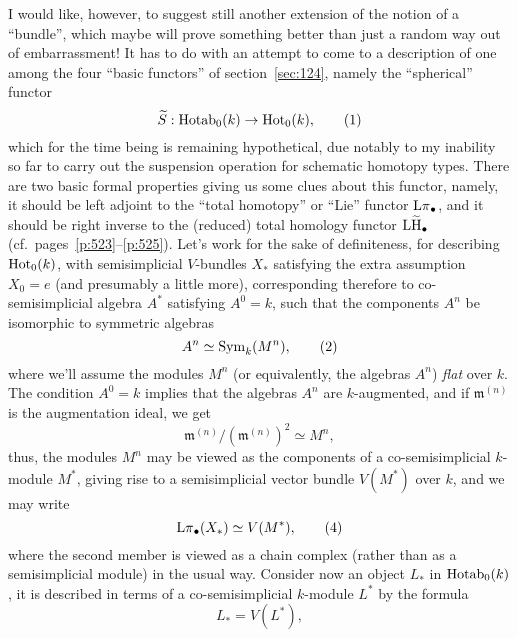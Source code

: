 I would like, however, to suggest still another extension
of the notion of a ``bundle'', which maybe will prove something better
than just a random way out of embarrassment! It has to do with an
attempt to come to a description of one among the four ``basic
functors'' of section~\ref{sec:124}, namely the ``spherical'' functor
\begin{equation}
  \label{eq:131.1}
  \widetilde S: \operatorname{Hotab}_0(k)\to\operatorname{Hot}_0(k),\tag{1}
\end{equation}
which for the time being is remaining hypothetical, due notably to my
inability so far to carry out the suspension operation for schematic
homotopy types. There are two basic formal properties giving us some
clues about this functor, namely, it should be left adjoint to the
``total homotopy'' or ``Lie'' functor $\operatorname{L\pi}_\bullet$, and it should be
right inverse to the (reduced) total homology functor $\operatorname{L\widetilde H}_\bullet$
(cf.\ pages~\ref{p:523}--\ref{p:525}). Let's work for the sake of
definiteness, for describing $\operatorname{Hot}_0(k)$, with semisimplicial
$V$-bundles $X_*$ satisfying the extra assumption $X_0=e$ (and
presumably a little more), corresponding therefore to
co-semisimplicial algebra $A^*$ satisfying $A^0=k$, such that the
components $A^n$ be isomorphic to symmetric algebras
\begin{equation}
  \label{eq:131.2}
  A^n\simeq \operatorname{Sym}_k(M^n),\tag{2}
\end{equation}
where we'll assume the modules $M^n$ (or equivalently, the algebras
$A^n$) \emph{flat} over $k$. The condition $A^0=k$ implies that the
algebras $A^n$ are $k$-augmented, and if $\mathfrak m^{(n)}$ is the
augmentation ideal, we get
\begin{equation}
  \label{eq:131.3}
  \mathfrak m^{(n)} / (\mathfrak m^{(n)})^2 \simeq M^n,\tag{3}
\end{equation}
thus, the modules $M^n$ may be viewed as the components of a
co-semisimplicial $k$-module $M^*$, giving rise to a semisimplicial
vector bundle $V(M^*)$ over $k$, and we may write
\begin{equation}
  \label{eq:131.4}
  \operatorname{L\pi}_\bullet(X_*) \simeq V(M^*),\tag{4}
\end{equation}
where the second member is viewed as a chain complex (rather than as a
semisimplicial module) in the usual way. Consider now an object $L_*$
in $\operatorname{Hotab}_0(k)$, it is described in terms of a co-semisimplicial
$k$-module $L^*$ by the formula
\begin{equation}
  \label{eq:131.5}
  L_*=V(L^*),\tag{5}
\end{equation}
